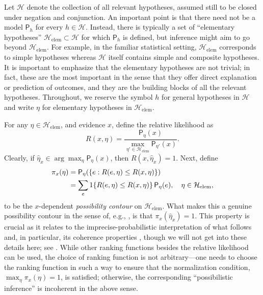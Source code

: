 \documentclass[a4paper, 12pt]{article}
\theoremstyle{plain}
\theoremstyle{definition}
\theoremstyle{remark}
\newcommand{\prob}{\mathsf{P}}
\renewcommand{\H}{\mathcal{H}}
\begin{document}
Let $\H$ denote the collection of all relevant hypotheses, assumed still to be closed under negation and conjunction.  An important point is that there need not be a model $\prob_h$ for every $h \in \H$.  Instead, there is typically a set of ``elementary hypotheses'' $\H_\text{elem} \subset \H$ for which $\prob_h$ is defined, but inference might aim to go beyond $\H_\text{elem}$.  For example, in the familiar statistical setting, $\H_\text{elem}$ corresponds to simple hypotheses whereas $\H$ itself contains simple and composite hypotheses. It is important to emphasize that the elementary hypotheses are not trivial; in fact, these are the most important in the sense that they   offer direct explanation or prediction of outcomes, and they are the building blocks of all the relevant hypotheses.  Throughout, we reserve the symbol $h$ for general hypotheses in $\H$ and write $\eta$ for elementary hypotheses in $\H_\text{elem}$. 

For any $\eta \in \H_\text{elem}$, and evidence $x$, define the relative likelihood as 
\[ R(x,\eta) = \frac{\prob_\eta(x)}{\max_{\eta' \in \H_\text{elem}} \prob_{\eta'}(x)}. \]
Clearly, if $\hat \eta_x \in \arg\max_\eta \prob_\eta(x)$, then $R(x, \hat \eta_x) = 1$.  Next, define 
\begin{align}
\pi_x(\eta) & = \prob_\eta(\{e: R(e,\eta) \leq R(x,\eta)\}) \notag \\
& = \sum_{e} 1\{R(e,\eta) \leq R(x,\eta)\} \, \prob_\eta(e), \quad \eta \in \H_\text{elem}, \label{eq:contour}
\end{align}
to be the $x$-dependent {\em possibility contour} on $\H_\text{elem}$.  What makes this a genuine possibility contour in the sense of, e.g., \citet{dubois.prade.book}, is that $\pi_x(\hat \eta_x) = 1$.  This property is crucial as it relates to the imprecise-probabilistic interpretation of what follows and, in particular, its coherence properties \citep[e.g.,][]{walley1991, lower.previsions.book, miranda2008}, though we will not get into these details here; see \citet[][App.~D]{imreview}.  While other ranking functions besides the relative likelihood can be used, the choice of ranking function is not arbitrary---one needs to choose the ranking function in such a way to ensure that the normalization condition, $\max_\eta \pi_x(\eta) = 1$, is satisfied; otherwise, the corresponding ``possibilistic inference'' is incoherent in the above sense. 
\end{document}

